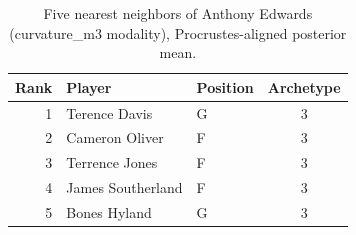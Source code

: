 \begin{table}[htbp]
  \centering\small
  \begin{tabular}{rllc}
    \toprule
    Rank & Player & Position & Archetype \\
    \midrule
    1 & Terence Davis & G & 3 \\
    2 & Cameron Oliver & F & 3 \\
    3 & Terrence Jones & F & 3 \\
    4 & James Southerland & F & 3 \\
    5 & Bones Hyland & G & 3 \\
    \bottomrule
  \end{tabular}
  \caption{Five nearest neighbors of Anthony Edwards (curvature_m3 modality), Procrustes-aligned posterior mean.}
  \label{tab:Anthony_Edwards_neighbors_curvature_m3}
\end{table}

